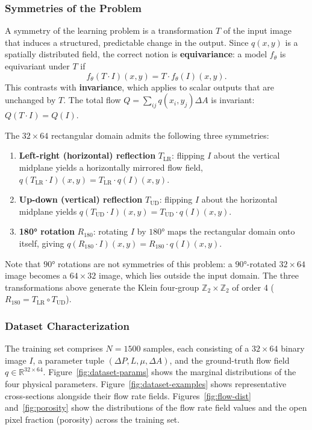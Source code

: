 \documentclass[conference,compsoc]{IEEEtran}
\begin{document}
\subsubsection{Symmetries of the Problem}

A symmetry of the learning problem is a transformation $T$ of the input image that induces a structured, predictable change in the output. Since $q(x,y)$ is a spatially distributed field, the correct notion is \textbf{equivariance}: a model $f_\theta$ is equivariant under $T$ if
\begin{equation}
  f_\theta(T\cdot I)(x,y) = T\cdot f_\theta(I)(x,y).
  \label{eq:equivariance}
\end{equation}
This contrasts with \textbf{invariance}, which applies to scalar outputs that are unchanged by $T$. The total flow $Q = \sum_{ij}q(x_i,y_j)\Delta A$ is invariant: $Q(T\cdot I) = Q(I)$.

The $32\times64$ rectangular domain admits the following three symmetries:

\begin{enumerate}
  \item \textbf{Left-right (horizontal) reflection} $T_\mathrm{LR}$: flipping $I$ about the vertical midplane yields a horizontally mirrored flow field, $q(T_\mathrm{LR}\cdot I)(x,y) = T_\mathrm{LR}\cdot q(I)(x,y)$.
  \item \textbf{Up-down (vertical) reflection} $T_\mathrm{UD}$: flipping $I$ about the horizontal midplane yields $q(T_\mathrm{UD}\cdot I)(x,y) = T_\mathrm{UD}\cdot q(I)(x,y)$.
  \item \textbf{180° rotation} $R_{180}$: rotating $I$ by $180°$ maps the rectangular domain onto itself, giving $q(R_{180}\cdot I)(x,y) = R_{180}\cdot q(I)(x,y)$.
\end{enumerate}

Note that $90°$ rotations are not symmetries of this problem: a $90°$-rotated $32\times64$ image becomes a $64\times32$ image, which lies outside the input domain. The three transformations above generate the Klein four-group $\mathbb{Z}_2\times\mathbb{Z}_2$ of order 4 ($R_{180} = T_\mathrm{LR}\circ T_\mathrm{UD}$).

\subsubsection{Dataset Characterization}

The training set comprises $N=1500$ samples, each consisting of a $32\times64$ binary image $I$, a parameter tuple $(\Delta P, L, \mu, \Delta A)$, and the ground-truth flow field $q\in\mathbb{R}^{32\times64}$. Figure~\ref{fig:dataset-params} shows the marginal distributions of the four physical parameters. Figure~\ref{fig:dataset-examples} shows representative cross-sections alongside their flow rate fields. Figures~\ref{fig:flow-dist} and~\ref{fig:porosity} show the distributions of the flow rate field values and the open pixel fraction (porosity) across the training set.
\end{document}
